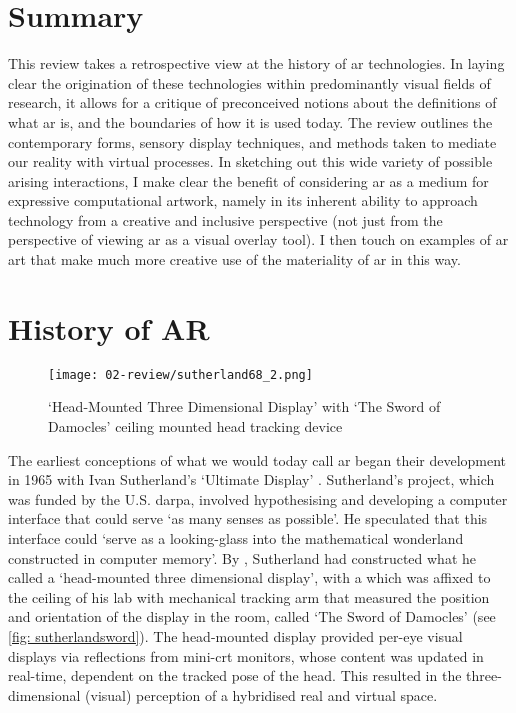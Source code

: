 \section{Summary}\label{sec: review-summary}
This review takes a retrospective view at the history of \gls{ar} technologies. In laying clear the origination of these technologies within predominantly visual fields of research, it allows for a critique of preconceived notions about the definitions of what \gls{ar} is, and the boundaries of how it is used today. The review outlines the contemporary forms, sensory display techniques, and methods taken to mediate our reality with virtual processes. In sketching out this wide variety of possible arising interactions, I make clear the benefit of considering \gls{ar} as a medium for expressive computational artwork, namely in its inherent ability to approach technology from a creative and inclusive perspective (not just from the perspective of viewing \gls{ar} as a visual overlay tool). I then touch on examples of \gls{ar} art that make much more creative use of the materiality of \gls{ar} in this way.



\section{History of AR}\label{sec: ar-history}
\begin{wrapfigure}{r}{0.45\textwidth}
    \vspace{-\intextsep}
    \hfill
    \begin{minipage}{0.95\linewidth}
        \texttt{[image: 02-review/sutherland68\_2.png]}
        \captionsetup{justification=justified}
        \caption{`Head-Mounted Three Dimensional Display' with `The Sword of Damocles' ceiling mounted head tracking device \citep[in][]{sutherland1968}}\label{fig: sutherlandsword}
    \end{minipage}
\end{wrapfigure}
The earliest conceptions of what we would today call \gls{ar} began their development in 1965 with Ivan Sutherland's `Ultimate Display' \citeyearpar{sutherland1965}. Sutherland's project, which was funded by the U.S. \gls{darpa}, involved hypothesising and developing a computer interface that could serve `as many senses as possible'. He speculated that this interface could `serve as a looking-glass into the mathematical wonderland constructed in computer memory'. By \citeyear{sutherland1968}, Sutherland had constructed what he called a `head-mounted three dimensional display', with a which was affixed to the ceiling of his lab with mechanical tracking arm that measured the position and orientation of the display in the room, called `The Sword of Damocles' (see \autoref{fig: sutherlandsword}). The head-mounted display provided per-eye visual displays via reflections from mini-\gls{crt} monitors, whose content was updated in real-time, dependent on the tracked pose of the head. This resulted in the three-dimensional (visual) perception of a hybridised real and virtual space.

